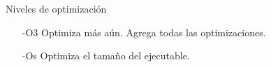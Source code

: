 \documentclass[aspectratio=169]{beamer}
\begin{document}
\begin{frame}[fragile,t]{Niveles de optimización}
\begin{itemize}
\item[-O3] Optimiza más aún. Agrega todas las optimizaciones.
\item[-Os] Optimiza el tamaño del ejecutable.
 
\end{itemize}
\end{frame}
\end{document}
